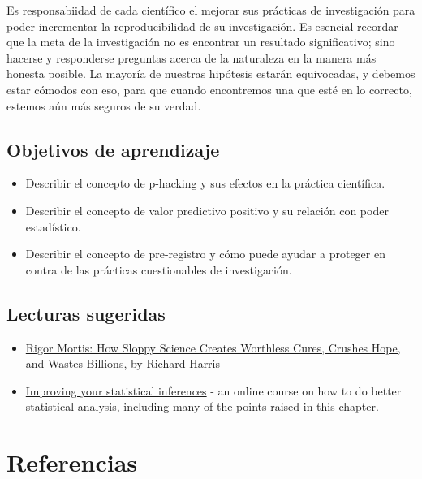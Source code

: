 \documentclass[
  12pt,
]{book}
\providecommand{\tightlist}{%
  \setlength{\itemsep}{0pt}\setlength{\parskip}{0pt}}
\theoremstyle{definition}
\theoremstyle{definition}
\theoremstyle{definition}
\theoremstyle{remark}
\begin{document}
Es responsabiidad de cada científico el mejorar sus prácticas de investigación para poder incrementar la reproducibilidad de su investigación. Es esencial recordar que la meta de la investigación no es encontrar un resultado significativo; sino hacerse y responderse preguntas acerca de la naturaleza en la manera más honesta posible. La mayoría de nuestras hipótesis estarán equivocadas, y debemos estar cómodos con eso, para que cuando encontremos una que esté en lo correcto, estemos aún más seguros de su verdad.

\hypertarget{objetivos-de-aprendizaje}{%
\section{Objetivos de aprendizaje}\label{objetivos-de-aprendizaje}}

\begin{itemize}
\tightlist
\item
  Describir el concepto de p-hacking y sus efectos en la práctica científica.
\item
  Describir el concepto de valor predictivo positivo y su relación con poder estadístico.
\item
  Describir el concepto de pre-registro y cómo puede ayudar a proteger en contra de las prácticas cuestionables de investigación.
\end{itemize}

\hypertarget{lecturas-sugeridas}{%
\section{Lecturas sugeridas}\label{lecturas-sugeridas}}

\begin{itemize}
\tightlist
\item
  \href{https://www.amazon.com/dp/B01K3WN72C}{Rigor Mortis: How Sloppy Science Creates Worthless Cures, Crushes Hope, and Wastes Billions, by Richard Harris}
\item
  \href{https://www.coursera.org/learn/statistical-inferences}{Improving your statistical inferences} - an online course on how to do better statistical analysis, including many of the points raised in this chapter.
\end{itemize}

\newpage

\hypertarget{referencias}{%
\chapter*{Referencias}\label{referencias}}
\end{document}
